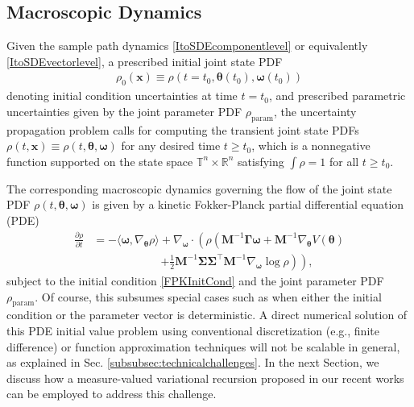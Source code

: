 \documentclass[10pt,twocolumn]{IEEEtran}
\begin{document}
\subsection{Macroscopic Dynamics}\label{subsec:macroscopic}
Given the sample path dynamics \eqref{ItoSDEcomponentlevel} or equivalently \eqref{ItoSDEvectorlevel}, a prescribed initial joint state PDF 
\begin{align}
\rho_{0}(\bm{x})\equiv\rho(t=t_{0},\bm{\theta}(t_{0}),\bm{\omega}(t_{0}))
\label{FPKInitCond}	
\end{align} 
denoting initial condition uncertainties at time $t=t_{0}$, and prescribed parametric uncertainties given by the joint parameter PDF $\rho_{\text{param}}$, the uncertainty propagation problem calls for computing the transient joint state PDFs $\rho(t,\bm{x})\equiv\rho(t,\bm{\theta},\bm{\omega})$ for any desired time $t \geq t_{0}$, which is a nonnegative function supported on the state space $\mathbb{T}^{n} \times \mathbb{R}^{n}$ satisfying $\int \rho = 1$ for all $t\geq t_{0}$.

The corresponding macroscopic dynamics governing the flow of the joint state PDF $\rho(t,\bm{\theta},\bm{\omega})$ is given by a kinetic Fokker-Planck partial differential equation (PDE)
\begin{align}
\frac{\partial \rho}{\partial t} &= - \langle \bm{\omega},\nabla_{\bm{\theta}}\rho \rangle  + \nabla_{\bm{\omega}} \cdot \left( \rho \left( \bm{M}^{-1}\bm{\Gamma}\bm{\omega} + \bm{M}^{-1}\nabla_{\bm{\theta}}V(\bm{\theta}) \right.\right.\nonumber\\
&\qquad\qquad\qquad \left.\left. +\frac{1}{2} \bm{M}^{-1}\bm{\Sigma}\bm{\Sigma}^{\top}\bm{M}^{-1} \nabla_{\bm{\omega}} \log \rho \right) \right),
\label{KineticFPK}	
\end{align}
subject to the initial condition \eqref{FPKInitCond} and the joint parameter PDF $\rho_{\text{param}}$. Of course, this subsumes special cases such as when either the initial condition or the parameter vector is deterministic. A direct numerical solution of this PDE initial value problem using conventional discretization (e.g., finite difference) or function approximation techniques will not be scalable in general, as explained in Sec. \ref{subsubsec:technicalchallenges}. In the next Section, we discuss how a measure-valued variational recursion proposed in our recent works \cite{caluya2019ACC,caluya2019TAC,halder2020hopfield,caluya2021TAC,caluya2020reflected} can be employed to address this challenge.
\end{document}
